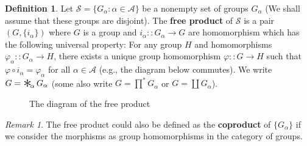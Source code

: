 \documentclass[a4paper,titlepage]{article}
\theoremstyle{remark}
\newtheorem*{remark}{Remark}
\theoremstyle{definition}
\theoremstyle{definition}
\newtheorem{definition}{Definition}
\theoremstyle{plain}
\DeclareMathOperator*{\freeprod}{\raisebox{-0.4ex}{\scalebox{2}{$\ast$}}\!}
\begin{document}
  \begin{definition}
    Let $\mathcal{S} = \{ G_\alpha : \alpha \in \mathcal{A} \}$ be a nonempty set of groups $G_{\alpha}$
    (We shall assume that these groups are disjoint).
    The {\bf free product} of $\mathcal{S}$ is a pair $(G, \{i_\alpha\})$ where $G$ is a group
    and $i_{\alpha} :: G_\alpha \to G$ are homomorphism which has the following universal property:
    For any group $H$ and homomorphisms $\varphi_\alpha :: G_\alpha \to H$, 
    there exists a unique group homomorphism $\varphi :: G \to H$ such that $\varphi \circ i_\alpha = \varphi_\alpha$ for
    all $\alpha \in \mathcal{A}$ (e.g., the diagram below commutes).
    We write $G = \freeprod_\alpha G_\alpha$ (some also write
    $G = \prod^* G_\alpha$ or $G = \coprod G_\alpha$).
  \end{definition}

  \begin{figure}[h]
    \centering
    \caption{The diagram of the free product}
  \end{figure}

  \begin{remark}
    The free product could also be defined as the {\bf coproduct} of $\{ G_\alpha \}$ if we consider the morphisms
    as group homomorphisms in the category of groups.
  \end{remark}
\end{document}
